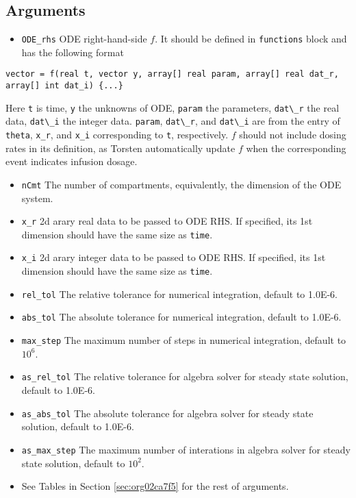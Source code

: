 \documentclass[12pt, reqno, oneside]{amsbook}
\numberwithin{equation}{chapter}
\numberwithin{figure}{chapter}
\numberwithin{table}{chapter}
\theoremstyle{remark}
\begin{document}
\subsection{Arguments}
\label{sec:org605fb37}
\begin{itemize}
\item \texttt{ODE\_rhs}
ODE right-hand-side \(f\). It should be defined in
\texttt{functions} block and has the following format
\end{itemize}
\begin{verbatim}
vector = f(real t, vector y, array[] real param, array[] real dat_r, array[] int dat_i) {...}
\end{verbatim}
Here \texttt{t} is time, \texttt{y} the unknowns of ODE, \texttt{param} the parameters, \texttt{dat\textbackslash{}\_r} the real data, \texttt{dat\textbackslash{}\_i}
the integer data. \texttt{param},
\texttt{dat\textbackslash{}\_r}, and \texttt{dat\textbackslash{}\_i} are from
the entry of \texttt{theta}, \texttt{x\_r},
and \texttt{x\_i} corresponding to
\texttt{t}, respectively.
\(f\) should not include dosing rates in its
definition, as Torsten automatically update \(f\)
when the corresponding event indicates infusion dosage.
\begin{itemize}
\item \texttt{nCmt}
The number of compartments, equivalently, the dimension of the ODE system.
\item \texttt{x\_r}
2d arary real data to be passed to ODE RHS. If specified, its 1st
dimension should have the same size as \texttt{time}.
\item \texttt{x\_i}
2d arary integer data to be passed to ODE RHS. If specified, its 1st
dimension should have the same size as \texttt{time}.
\item \texttt{rel\_tol}
The relative tolerance for numerical integration, default to 1.0E-6.
\item \texttt{abs\_tol}
The absolute tolerance for numerical integration, default to 1.0E-6.
\item \texttt{max\_step}
The maximum number of steps in numerical integration, default to \(10^6\).
\item \texttt{as\_rel\_tol}
The relative tolerance for algebra solver for steady state solution, default to 1.0E-6.
\item \texttt{as\_abs\_tol}
The absolute tolerance for algebra solver for steady state solution, default to 1.0E-6.
\item \texttt{as\_max\_step}
The maximum number of interations in algebra solver for steady state solution, default to \(10^2\).
\item See Tables in Section \ref{sec:org02ca7f5} for the rest of arguments.
\end{itemize}
\end{document}

